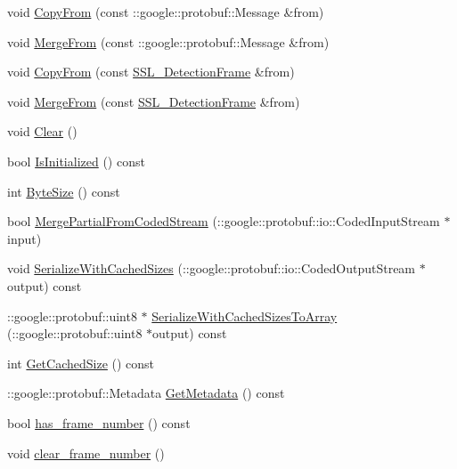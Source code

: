 \begin{DoxyCompactItemize}
\item 
void \hyperlink{class_s_s_l___detection_frame_a8973b47a9307b5a9b374a5b1bfd4de61}{Copy\-From} (const \-::google\-::protobuf\-::\-Message \&from)
\item 
void \hyperlink{class_s_s_l___detection_frame_a6cb35c4ed084768ef93fecaa7f0f2a56}{Merge\-From} (const \-::google\-::protobuf\-::\-Message \&from)
\item 
void \hyperlink{class_s_s_l___detection_frame_a1970897698e86f47df161d3746e9e28d}{Copy\-From} (const \hyperlink{class_s_s_l___detection_frame}{S\-S\-L\-\_\-\-Detection\-Frame} \&from)
\item 
void \hyperlink{class_s_s_l___detection_frame_aee0addfeb08cdd0b010c6953dc1242db}{Merge\-From} (const \hyperlink{class_s_s_l___detection_frame}{S\-S\-L\-\_\-\-Detection\-Frame} \&from)
\item 
void \hyperlink{class_s_s_l___detection_frame_a44080889c1867eebccccc7b320e5c243}{Clear} ()
\item 
bool \hyperlink{class_s_s_l___detection_frame_ad15f5a171fafe5f7ccd3a6974bd55977}{Is\-Initialized} () const 
\item 
int \hyperlink{class_s_s_l___detection_frame_aef7a4cb9df32c508d51749bd3d440da7}{Byte\-Size} () const 
\item 
bool \hyperlink{class_s_s_l___detection_frame_a8e6d350d2b4ad782af0a40f0e0358500}{Merge\-Partial\-From\-Coded\-Stream} (\-::google\-::protobuf\-::io\-::\-Coded\-Input\-Stream $\ast$input)
\item 
void \hyperlink{class_s_s_l___detection_frame_adf774538986f0429aef8132bb6ac5975}{Serialize\-With\-Cached\-Sizes} (\-::google\-::protobuf\-::io\-::\-Coded\-Output\-Stream $\ast$output) const 
\item 
\-::google\-::protobuf\-::uint8 $\ast$ \hyperlink{class_s_s_l___detection_frame_ae1b7ac86c33a8ad56665c92d754e770f}{Serialize\-With\-Cached\-Sizes\-To\-Array} (\-::google\-::protobuf\-::uint8 $\ast$output) const 
\item 
int \hyperlink{class_s_s_l___detection_frame_a4dd8cdd9d9143d2f411b390eb40404a4}{Get\-Cached\-Size} () const 
\item 
\-::google\-::protobuf\-::\-Metadata \hyperlink{class_s_s_l___detection_frame_a812b525a70447b0fde86b27842bdb112}{Get\-Metadata} () const 
\item 
bool \hyperlink{class_s_s_l___detection_frame_af62ec0cbd26a2b09fea984166d537b2f}{has\-\_\-frame\-\_\-number} () const 
\item 
void \hyperlink{class_s_s_l___detection_frame_a2b172fbe2e5f27cb8def841af4f1a461}{clear\-\_\-frame\-\_\-number} ()

\end{DoxyCompactItemize}
